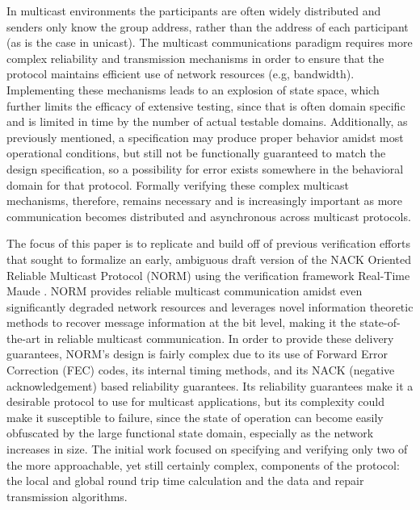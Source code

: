 \documentclass[10pt, journal]{IEEEtran}
\begin{document}
In multicast environments the participants are often widely distributed and senders only know the group address, rather than the address of each participant (as is the case in unicast). The multicast communications paradigm requires more complex reliability and transmission mechanisms in order to ensure that the protocol maintains efficient use of network resources (e.g, bandwidth). Implementing these mechanisms leads to an explosion of state space, which further limits the efficacy of extensive testing, since that is often domain specific and is limited in time by the number of actual testable domains. Additionally, as previously mentioned, a specification may produce proper behavior amidst most operational conditions, but still not be functionally guaranteed to match the design specification, so a possibility for error exists somewhere in the behavioral domain for that protocol. Formally verifying these complex multicast mechanisms, therefore, remains necessary and is increasingly important as more communication becomes distributed and asynchronous across multicast protocols.

The focus of this paper is to replicate and build off of previous verification efforts that sought to formalize an early, ambiguous draft version of the NACK Oriented Reliable Multicast Protocol (NORM) using the verification framework Real-Time Maude \cite{Lien2004, rfc5740, rtmaudeUrl, maudeUrl}. NORM provides reliable multicast communication amidst even significantly degraded network resources and leverages novel information theoretic methods to recover message information at the bit level, making it the state-of-the-art in reliable multicast communication. In order to provide these delivery guarantees, NORM's design is fairly complex due to its use of Forward Error Correction (FEC) codes, its internal timing methods, and its NACK (negative acknowledgement) based reliability guarantees. Its reliability guarantees make it a desirable protocol to use for multicast applications, but its complexity could make it susceptible to failure, since the state of operation can become easily obfuscated by the large functional state domain, especially as the network increases in size. The initial work focused on specifying and verifying only two of the more approachable, yet still certainly complex, components of the protocol: the local and global round trip time calculation and the data and repair transmission algorithms. 
\end{document}
